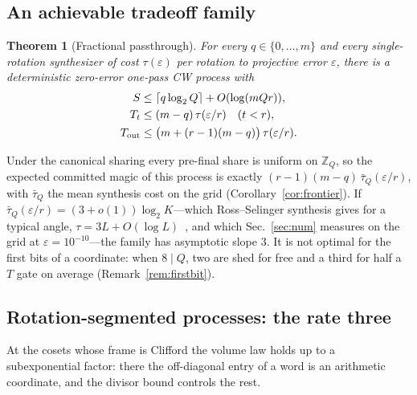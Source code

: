 \documentclass[aps,prx,twocolumn,superscriptaddress,nofootinbib,longbibliography]{revtex4-2}
\theoremstyle{plain}
\newtheorem{theorem}{Theorem}
\theoremstyle{definition}
\theoremstyle{remark}
\newcommand{\Tout}{T_{\mathrm{out}}}
\newcommand{\Z}{\mathbb{Z}}
\begin{document}
\subsection{An achievable tradeoff family}\label{sec:frontier}


\begin{theorem}[Fractional passthrough]\label{thm:frontier}
For every $q\in\{0,\dots,m\}$ and every single-rotation synthesizer of cost $\tau(\varepsilon)$ per rotation to projective error $\varepsilon$, there is a deterministic zero-error one-pass CW process with
\begin{align}
S&\le\lceil q\log_2Q\rceil+O(\log(mQr)),\notag\\
T_t&\le(m-q)\,\tau(\varepsilon/r)\quad(t<r),\notag\\
\Tout&\le\big(m+(r-1)(m-q)\big)\,\tau(\varepsilon/r).
\end{align}
\end{theorem}
Under the canonical sharing every pre-final share is uniform on $\Z_Q$, so the expected committed magic of this process is exactly $(r-1)(m-q)\,\bar\tau_Q(\varepsilon/r)$, with $\bar\tau_Q$ the mean synthesis cost on the grid (Corollary~\ref{cor:frontier}). If $\bar\tau_Q(\varepsilon/r)=(3+o(1))\log_2K$---which Ross--Selinger synthesis gives for a typical angle, $\tau=3L+O(\log L)$~\cite{RossSelinger}, and which Sec.~\ref{sec:num} measures on the grid at $\varepsilon=10^{-10}$---the family has asymptotic slope $3$. It is not optimal for the first bits of a coordinate: when $8\mid Q$, two are shed for free and a third for half a $T$ gate on average (Remark~\ref{rem:firstbit}).

\subsection{Rotation-segmented processes: the rate three}\label{sec:seg}

At the cosets whose frame is Clifford the volume law holds up to a subexponential factor: there the off-diagonal entry of a word is an arithmetic coordinate, and the divisor bound controls the rest.
\end{document}
